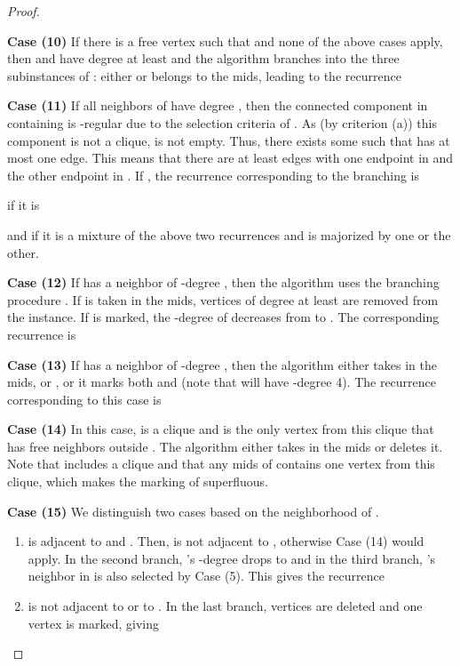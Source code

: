 \documentclass[a4paper,10pt]{article}
\theoremstyle{plain}
\theoremstyle{definition}
\theoremstyle{remark}
\newcommand{\mids}{mids\xspace}
\begin{document}
\begin{proof}
\begin{enumerate}
\begin{enumerate}
\begin{enumerate}
\end{enumerate}
\end{enumerate}
\end{enumerate}

{\bf Case (10)}
If there is a free vertex  such that  and none of the above cases
apply, then  and  have degree at least  and the algorithm branches into the 
three subinstances of : either  or  belongs to the \mids, leading to the recurrence


{\bf Case (11)}
If all neighbors of  have degree , then the connected component in  containing 
 is -regular due to the selection criteria of . As (by criterion (a)) this 
component is not a clique,  is not empty. Thus, there exists some  
such that  has at most one edge. This means that there are at least  edges 
with one endpoint in  and the other endpoint in . If , the recurrence corresponding to the 
branching  is

if  it is

and if  it is a mixture of the above two recurrences and is majorized by one
or the other.

{\bf Case (12)}
If  has a neighbor  of -degree , then the algorithm uses the branching procedure
. If  is taken in the \mids,  vertices of degree at least  are
removed from the instance. If  is marked, the -degree of  decreases from  to . The corresponding recurrence is


{\bf Case (13)}
If  has a neighbor  of -degree , then the algorithm either takes  in the 
\mids, or , or it marks both  and  (note that  will have -degree 4). The recurrence corresponding to this case is


{\bf Case (14)}
In this case,  is a clique and  is the only vertex from this clique that has
free neighbors outside . The algorithm either takes  in the \mids or deletes 
it. Note that  includes a clique and that any \mids of  contains one vertex from this clique, which makes the marking of  superfluous. 


{\bf Case (15)}
We distinguish two cases based on the neighborhood of .
\begin{enumerate}
\item  is adjacent to  and . Then,  is not adjacent to , otherwise
Case (14) would apply. In the second branch, 's -degree drops to  and in the
third branch, 's neighbor in  is also selected by Case (5). This gives the
recurrence

\item  is not adjacent to  or to . In the last branch,  vertices are deleted and one vertex is marked, giving


\end{enumerate}
\end{proof}
\end{document}
